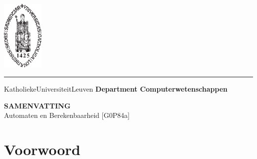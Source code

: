 \documentclass[a4paper]{article}
\begin{document}
\begin{titlepage}
    \newpage
    \thispagestyle{empty}
    \frenchspacing
    \hspace{-0.2cm}
    \includegraphics[height=3.4cm]{assets/sedes}
    \hspace{0.2cm}
    \rule{0.5pt}{3.4cm}
    \hspace{0.2cm}
    \begin{minipage}[b]{8cm}
        \large{Katholieke\newline Universiteit\newline Leuven}\smallskip\newline
        \large{}\smallskip\newline
        \textbf{Department \newline Computerwetenschappen}\smallskip
    \end{minipage}
    \vspace*{3.2cm}\vfill
    \begin{center}
        \begin{minipage}[t]{\textwidth}
            \begin{center}
                \large{\rm{\textbf{\uppercase{Samenvatting}}}}\\
                \large{\rm{Automaten en Berekenbaarheid [G0P84a]}}
            \end{center}
        \end{minipage}
    \end{center}
    \vfill
    \hfill{}
\end{titlepage}

\tableofcontents

\newpage

\section{Voorwoord}
\end{document}
